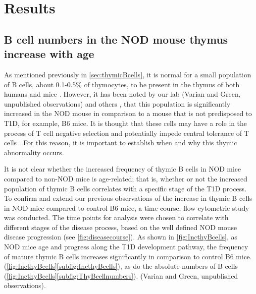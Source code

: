 
\chapter{Results}


\section{B cell numbers in the NOD mouse thymus increase with age}

As mentioned previously in \cref{sec:thymicBcells}, it is normal for a small population of B cells, about 0.1-0.5\% of thymocytes, to be present in the thymus of both humans and mice \citep{Perera2013}.
However, it has been noted by our lab (Varian and Green, unpublished observations) and others \citep{OReilly1994}, that this population is significantly increased in the NOD mouse in comparison to a mouse that is not predisposed to T1D, for example, B6 mice.
It is thought that these cells may have a role in the process of T cell negative selection and potentially impede central tolerance of T cells \citep{Starr2003, Perera2013} .
For this reason, it is important to establish when and why this thymic abnormality occurs.


It is not clear whether the increased frequency of thymic B cells in NOD mice compared to non-NOD mice is age-related; that is, whether or not the increased population of thymic B cells correlates with a specific stage of the T1D process.
To confirm and extend our previous observations of the increase in thymic B cells in NOD mice compared to control B6 mice, a time-course, flow cytometric study was conducted. %
The time points for analysis were chosen to correlate with different stages of the disease process, based on the well defined NOD mouse disease progression (see \cref{fig:diseasecourse}).
As shown in \cref{fig:IncthyBcells}, as NOD mice age and progress along the T1D development pathway, the frequency of mature thymic B cells increases significantly in comparison to control B6 mice. (\cref{fig:IncthyBcells}\ref{subfig:IncthyBcells}), as do the absolute numbers of B cells (\cref{fig:IncthyBcells}\ref{subfig:ThyBcellnumbers}). (Varian and Green, unpublished observations).

